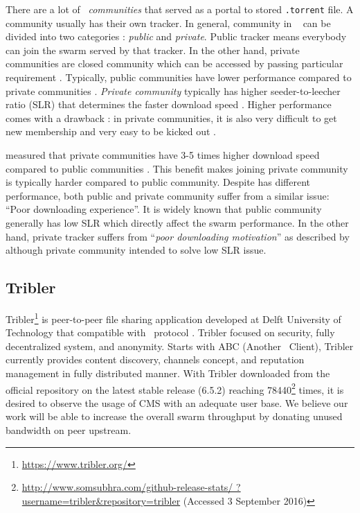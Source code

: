 There are a lot of \bt~\textit{communities} that served as a portal to stored \texttt{.torrent} file. A community usually has their own tracker. In general, community in \bt~ can be divided into two categories : \textit{public} and \textit{private}. Public tracker means everybody can join the swarm served by that tracker. In the other hand, private communities are closed community which can be accessed by passing particular requirement \cite{2010:pubpriv:meulpolder, 2014:sustainabilitytorrent:chen}. Typically, public communities have lower performance compared to private communities \cite{2010:pubpriv:meulpolder}. \textit{Private community} typically has higher seeder-to-leecher ratio (SLR) that determines the faster download speed \cite{2005:bittorrentcooperation:andrade}. Higher performance comes with a drawback : in private communities, it is also very difficult to get new membership and very easy to be kicked out \cite{2013:survivepriv:jia}.

\citeauthor{2010:pubpriv:meulpolder} measured that private communities have 3-5 times higher download speed compared to public communities \cite{2010:pubpriv:meulpolder}. This benefit makes joining private community is typically harder compared to public community. Despite has different performance, both public and private community suffer from a similar issue: ``Poor downloading experience''. It is widely known that public community generally has low SLR which directly affect the swarm performance. In the other hand, private tracker suffers from ``\textit{poor downloading motivation}'' as described by \citeauthor{2014:sustainabilitytorrent:chen}\cite{2014:sustainabilitytorrent:chen} although private community intended to solve low SLR issue. 


\subsection{Tribler}
\label{section:tribler}
Tribler\footnote{\url{https://www.tribler.org/}} is peer-to-peer file sharing application developed at Delft University of Technology that compatible with \bt~protocol \cite{2008:tribler:pouwelse}. Tribler focused on security, fully decentralized system, and anonymity. Starts with ABC (Another \bt~Client), Tribler currently provides content discovery, channels concept, and reputation management in fully distributed manner. With Tribler downloaded from the official repository on the latest stable release (6.5.2) reaching  78440\footnote{\url{http://www.somsubhra.com/github-release-stats/ ?username=tribler&repository=tribler} (Accessed 3 September 2016)} times, it is desired to observe the usage of CMS with an adequate user base. We believe our work will be able to increase the overall swarm throughput by donating unused bandwidth on peer upstream.

